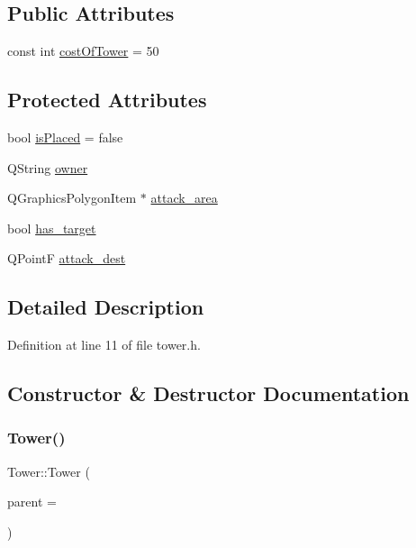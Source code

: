 \subsection*{Public Attributes}
\begin{DoxyCompactItemize}
\item 
const int \hyperlink{class_tower_ac97e0d44e295399c5cac3cc6e2060df6}{cost\+Of\+Tower} = 50
\end{DoxyCompactItemize}
\subsection*{Protected Attributes}
\begin{DoxyCompactItemize}
\item 
bool \hyperlink{class_tower_a1317cf5400c63351e0d66b17df5c0417}{is\+Placed} = false
\item 
Q\+String \hyperlink{class_tower_abff7e8aaf637c17bcba08f9097db38df}{owner}
\item 
Q\+Graphics\+Polygon\+Item $\ast$ \hyperlink{class_tower_a628af042db1aa134f2ab18b1f2b0eeb9}{attack\+\_\+area}
\item 
bool \hyperlink{class_tower_a568b9b12bc604fb245a79476b71d6557}{has\+\_\+target}
\item 
Q\+PointF \hyperlink{class_tower_a2b3e8ab90ccceed1fa3a667db80c2c06}{attack\+\_\+dest}
\end{DoxyCompactItemize}


\subsection{Detailed Description}


Definition at line 11 of file tower.\+h.



\subsection{Constructor \& Destructor Documentation}
\mbox{\label{class_tower_aa3ff2c932ed113a80a122dbe2e3e0176}} 
\subsubsection{\texorpdfstring{Tower()}{Tower()}}
{\footnotesize\ttfamily Tower\+::\+Tower (\begin{DoxyParamCaption}\item[{Q\+Graphics\+Item $\ast$}]{parent = {} }\end{DoxyParamCaption})}



